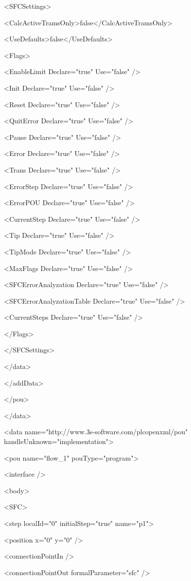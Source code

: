  <SFCSettings>

  <CalcActiveTramsOnly>false</CalcActiveTramsOnly>

  <UseDefaults>false</UseDefaults>

  <Flags>

   <EnableLimit Declare="true" Use="false" />

   <Init Declare="true" Use="false" />

   <Reset Declare="true" Use="false" />

   <QuitError Declare="true" Use="false" />

   <Pause Declare="true" Use="false" />

   <Error Declare="true" Use="false" />

   <Trans Declare="true" Use="false" />

   <ErrorStep Declare="true" Use="false" />

   <ErrorPOU Declare="true" Use="false" />

   <CurrentStep Declare="true" Use="false" />

   <Tip Declare="true" Use="false" />

   <TipMode Declare="true" Use="false" />

   <MaxFlags Declare="true" Use="false" />

   <SFCErrorAnalyzation Declare="true" Use="false" />

   <SFCErrorAnalyzationTable Declare="true" Use="false" />

   <CurrentSteps Declare="true" Use="false" />

  </Flags>

 </SFCSettings>

</data>

</addData>

</pou>

</data>

<data name="http://www.3s-software.com/plcopenxml/pou" handleUnknown="implementation">

<pou name="flow\_1" pouType="program">

<interface />

<body>

<SFC>

 <step localId="0" initialStep="true" name="p1">

  <position x="0" y="0" />

  <connectionPointIn />

  <connectionPointOut formalParameter="sfc" />

